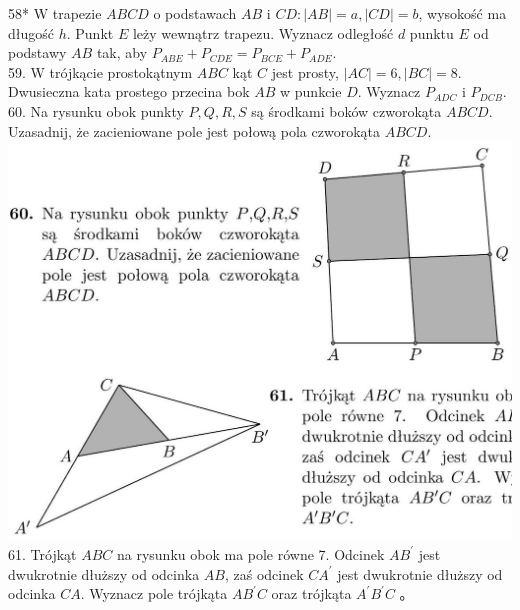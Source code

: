 \documentclass[10pt]{article}
\begin{document}
58* W trapezie \(A B C D\) o podstawach \(A B\) i \(C D:|A B|=a,|C D|=b\), wysokość ma długość \(h\). Punkt \(E\) leży wewnątrz trapezu. Wyznacz odległość \(d\) punktu \(E\) od podstawy \(A B\) tak, aby \(P_{A B E}+P_{C D E}=P_{B C E}+P_{A D E}\).\\
59. W trójkącie prostokątnym \(A B C\) kąt \(C\) jest prosty, \(|A C|=6,|B C|=8\). Dwusieczna kata prostego przecina bok \(A B\) w punkcie \(D\). Wyznacz \(P_{A D C}\) i \(P_{D C B}\).\\
60. Na rysunku obok punkty \(P, Q, R, S\) są środkami boków czworokąta \(A B C D\). Uzasadnij, że zacieniowane pole jest połową pola czworokąta \(A B C D\).\\
\includegraphics[max width=\textwidth, center]{2024_11_21_71f62bd117d375398909g-043}\\
61. Trójkąt \(A B C\) na rysunku obok ma pole równe 7. Odcinek \(A B^{\prime}\) jest dwukrotnie dłuższy od odcinka \(A B\), zaś odcinek \(C A^{\prime}\) jest dwukrotnie dłuższy od odcinka \(C A\). Wyznacz pole trójkąta \(A B^{\prime} C\) oraz trójkąta \(A^{\prime} B^{\prime} C\) 。
\end{document}
